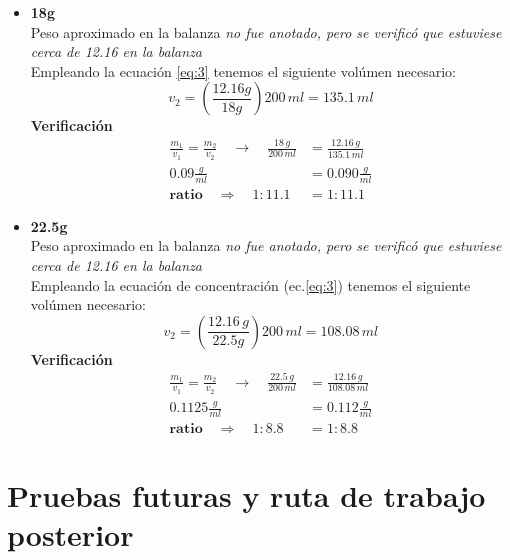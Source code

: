 \documentclass{article}
\begin{document}
\begin{itemize}
\item[$\bullet$] \textbf{18g} \\
Peso aproximado en la balanza \textit{no fue anotado, pero se verificó que estuviese cerca de 12.16 en la balanza}\\
Empleando la ecuación \ref{eq:3} tenemos el siguiente volúmen necesario:
\[  v_{2} = \left(  \frac{12\text{.}16g   }{18g}  \right) 200\, ml = 135\text{.}1\, ml  \]
\textbf{Verificación}
\begin{equation*}
\begin{split}
 \frac{m_{1}}{v_{1}} = \frac{ m_{2} }{v_{2}} \quad \to \quad \frac{ 18\, g  }{200 \, ml} &= \frac{12\text{.}16\, g }{135\text{.}1\,ml}\\
0\text{.}09 \frac{g}{ml} &= 0\text{.}090 \frac{g}{ml}\\
\textbf{ratio} \quad \Rightarrow \quad  \boxed{1:11\text{.}1} &= \boxed{1:11\text{.}1} 
\end{split}
\end{equation*}
\end{itemize}

\begin{itemize}
\item[$\bullet$] \textbf{22.5g} \\
Peso aproximado en la balanza \textit{no fue anotado, pero se verificó que estuviese cerca de 12.16 en la balanza}\\
Empleando la ecuación de concentración  (ec.\ref{eq:3}) tenemos el siguiente volúmen necesario:
\[  v_{2} = \left(  \frac{12\text{.}16\,g }{22\text{.}5g}  \right) 200\, ml = 108\text{.}08\, ml  \]
\textbf{Verificación}
\begin{equation*}
\begin{split}
 \frac{m_{1}}{v_{1}} = \frac{ m_{2} }{v_{2}} \quad \to \quad \frac{22\text{.}5\, g  }{200 \, ml} &= \frac{12\text{.}16\, g }{108\text{.}08\,ml}\\
0\text{.}1125 \frac{g}{ml} &= 0\text{.}112 \frac{g}{ml}\\
\textbf{ratio} \quad \Rightarrow \quad  \boxed{1:8\text{.}8} &= \boxed{1:8\text{.}8} 
\end{split}
\end{equation*}
\end{itemize}


\section{Pruebas futuras y ruta de trabajo posterior}
\end{document}
